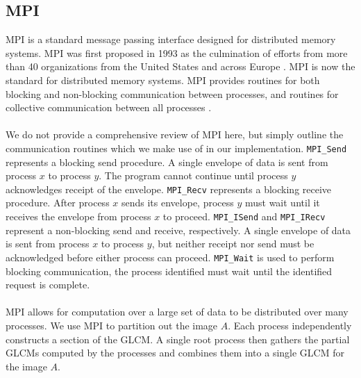 \documentclass{article}
\begin{document}
\subsection{MPI}
   MPI is a standard message passing interface
   designed for distributed memory systems. MPI was first proposed in 1993 as the culmination of efforts from more than 40 organizations from  the United States and across Europe \cite{mpi1}. MPI is now the standard for distributed memory systems. MPI provides routines for both blocking and non-blocking communication between processes, and routines for collective communication between all processes \cite{mpi}. \\ \\ 
   We do not provide a comprehensive review of MPI here, but simply outline the communication routines which we make use of in our implementation. \texttt{MPI\_Send} represents a blocking send procedure. A single envelope of data is sent from process $x$ to process $y$. The program cannot continue until process $y$ acknowledges receipt of the envelope. \texttt{MPI\_Recv} represents a blocking receive procedure. After process $x$ sends its envelope, process $y$ must wait until it receives the envelope from process $x$ to proceed. \texttt{MPI\_ISend} and \texttt{MPI\_IRecv} represent a non-blocking send and receive, respectively. A single envelope of data is sent from process $x$ to process $y$, but neither receipt nor send must be acknowledged before either process can proceed. \texttt{MPI\_Wait} is used to perform blocking communication, the process identified must wait until the identified request is complete. \\ \\ 
   MPI allows for computation over a large set of data to be distributed over many processes. We use MPI to partition out the image $A$. Each process independently constructs a section of the GLCM. A single root process then gathers the partial GLCMs computed by the processes and combines them into a single GLCM for the image $A$. 
\end{document}
